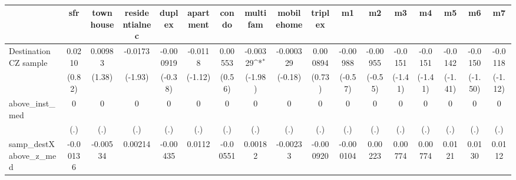 \begin{table}[htbp]\centering
\def\sym#1{\ifmmode^{#1}\else\(^{#1}\)\fi}
\caption{ \label{tab1}}
\begin{tabular}{l*{16}{c}}
\toprule
                    &\multicolumn{1}{c}{sfr}&\multicolumn{1}{c}{townhouse}&\multicolumn{1}{c}{residentialnec}&\multicolumn{1}{c}{duplex}&\multicolumn{1}{c}{apartment}&\multicolumn{1}{c}{condo}&\multicolumn{1}{c}{multifam}&\multicolumn{1}{c}{mobilehome}&\multicolumn{1}{c}{triplex}&\multicolumn{1}{c}{m1}&\multicolumn{1}{c}{m2}&\multicolumn{1}{c}{m3}&\multicolumn{1}{c}{m4}&\multicolumn{1}{c}{m5}&\multicolumn{1}{c}{m6}&\multicolumn{1}{c}{m7}\\
\midrule
Destination CZ sample&      0.0210         &     0.00983         &     -0.0173         &   -0.000919         &     -0.0118         &     0.00553         &    -0.00329\sym{*}  &   -0.000329         &    0.000894         &    -0.00988         &    -0.00955         &     -0.0151         &     -0.0151         &     -0.0142         &     -0.0150         &     -0.0118         \\
                    &      (0.82)         &      (1.38)         &     (-1.93)         &     (-0.38)         &     (-1.12)         &      (0.56)         &     (-1.98)         &     (-0.18)         &      (0.73)         &     (-0.57)         &     (-0.55)         &     (-1.41)         &     (-1.41)         &     (-1.41)         &     (-1.50)         &     (-1.12)         \\
\addlinespace
above\_inst\_med      &           0         &           0         &           0         &           0         &           0         &           0         &           0         &           0         &           0         &           0         &           0         &           0         &           0         &           0         &           0         &           0         \\
                    &         (.)         &         (.)         &         (.)         &         (.)         &         (.)         &         (.)         &         (.)         &         (.)         &         (.)         &         (.)         &         (.)         &         (.)         &         (.)         &         (.)         &         (.)         &         (.)         \\
\addlinespace
samp\_destXabove\_z\_med&    -0.00136         &    -0.00534         &     0.00214         &    -0.00435         &      0.0112         &    -0.00551         &     0.00182         &    -0.00233         &   -0.000920         &   -0.000104         &     0.00223         &     0.00774         &     0.00774         &      0.0121         &      0.0130         &      0.0112         \\

\end{tabular}
\end{table}
